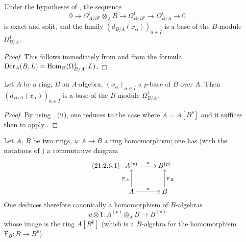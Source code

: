 \begin{corollary}[21.2.4]
\label{0.21.2.4}
Under the hypotheses of , the sequence
\begin{equation}
\tag{21.2.4.1}
  \label{0.21.2.4.1}
  0\to\Omega^1_{A/B^p}\otimes_A B\to\Omega^1_{B/B^p}\to\Omega^1_{B/A}\to 0
\end{equation}
is exact and split, and the family $(d_{B/A}(x_\alpha))_{\alpha\in I}$ is a base of the $B$-module $\Omega^1_{B/A}$.
\end{corollary}

\begin{proof}
This follows immediately from  and from the formula $\operatorname{Der}_A(B,L)=\operatorname{Hom}_B(\Omega^1_{B/A},L)$.
\end{proof}

\begin{corollary}[21.2.5]
\label{0.21.2.5}
Let $A$ be a ring, $B$ an $A$-algebra, $(x_\alpha)_{\alpha\in I}$ a $p$-base of $B$ over $A$.
Then $(d_{B/A}(x_\alpha))_{\alpha\in I}$ is a base of the $B$-module $\Omega^1_{B/A}$.
\end{corollary}

\begin{proof}
By using , (ii), one reduces to the case where $A=A[B^p]$ and it suffices then to apply .
\end{proof}

\begin{env}[21.2.6]
\label{0.21.2.6}
Let $A$, $B$ be two rings, $u:A\to B$ a ring homomorphism; one has (with the notations of ) a commutative diagram
\begin{equation}
\tag{21.2.6.1}
  \label{0.21.2.6.1}
\xymatrix{
  A^{(p)} \ar[r]^{u} & B^{(p)} \\
  A \ar[u]^{\mathrm{F}_A} \ar[r]^{u} & B \ar[u]_{\mathrm{F}_B}
}
\end{equation}
One deduces therefore canonically a homomorphism of $B$-algebras
\begin{equation}
\tag{21.2.6.2}
  \label{0.21.2.6.2}
  u\otimes 1:A^{(p)}\otimes_A B\to B^{(p)}
\end{equation}
whose image is the ring $A[B^p]$ (which is a $B$-algebra for the homomorphism $\mathrm{F}_B:B\to B^p$).
\end{env}

